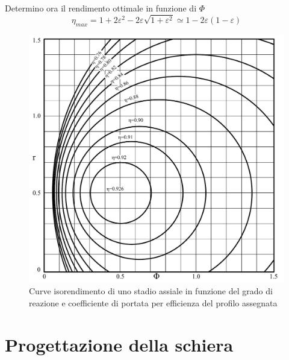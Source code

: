 Determino ora il rendimento ottimale in funzione di $\Phi$
\begin{equation}
\eta_{max} = 1 + 2 \varepsilon^2 - 2 \varepsilon \sqrt{1 + \varepsilon^2} \simeq 1 - 2 \varepsilon \left( 1 - \varepsilon \right)
\end{equation}
\begin{figure}
\centering
  \includegraphics[width=\textwidth]{fig/IsoRendCompAss.pdf}
\caption{Curve isorendimento di uno stadio assiale in funzione del grado di reazione e coefficiente di portata per efficienza del profilo assegnata}
\label{}
\end{figure}

\section{Progettazione della schiera}
